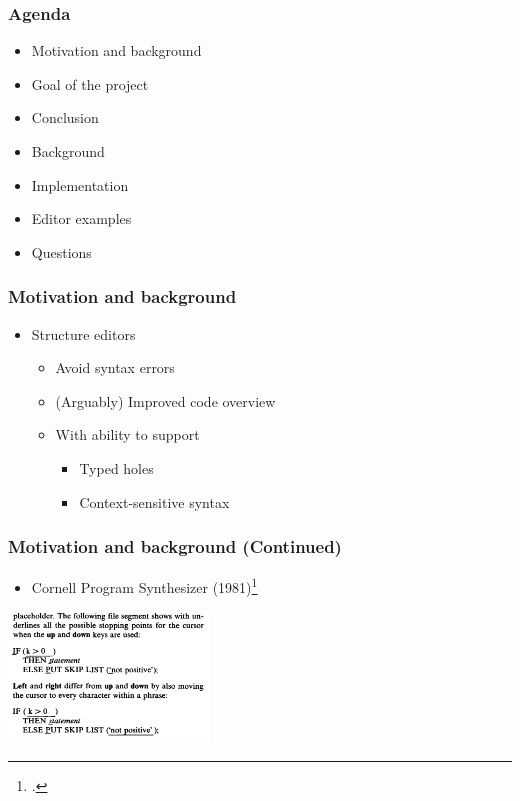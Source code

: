 \documentclass[t,24pt,aspectratio=169]{beamer}
\begin{document}
\begin{frame}[hvid]
    \frametitle{Agenda}

    \begin{itemize}
        \item Motivation and background
        \item Goal of the project
        \item Conclusion
        \item Background
        \item Implementation
        \item Editor examples
        \item Questions
    \end{itemize}
\end{frame}

\begin{frame}[hvid]
    \frametitle{Motivation and background}
    \begin{itemize}
        \item Structure editors
              \begin{itemize}
                  \item Avoid syntax errors
                  \item (Arguably) Improved code overview
                  \item With ability to support
                        \begin{itemize}
                            \item Typed holes
                            \item Context-sensitive syntax
                        \end{itemize}
              \end{itemize}
    \end{itemize}
\end{frame}


\begin{frame}[hvid]
    \frametitle{Motivation and background (Continued)}

    \begin{multicols}{2}
        \begin{itemize}
            \item Cornell Program Synthesizer (1981)\footcite{timtom81}

        \end{itemize}
        \vfill\null
        \columnbreak
        \includegraphics[width=0.4\textwidth]{img/cornell-ex.png}
    \end{multicols}
\end{frame}
\end{document}
